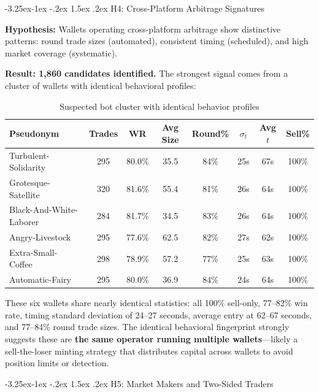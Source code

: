 \documentclass[11pt,a4paper]{article}
\makeatletter
\renewcommand\subsection{\@startsection{subsection}{2}{\z@}%
  {-3.25ex\@plus -1ex \@minus -.2ex}%
  {1.5ex \@plus .2ex}%
  {\normalfont\large\bfseries}}
\makeatother
\begin{document}
\subsection{H4: Cross-Platform Arbitrage Signatures}

\textbf{Hypothesis:} Wallets operating cross-platform arbitrage show distinctive patterns: round trade sizes (automated), consistent timing (scheduled), and high market coverage (systematic).

\textbf{Result: 1,860 candidates identified.} The strongest signal comes from a cluster of wallets with identical behavioral profiles:

\begin{table}[H]
\centering
\caption{Suspected bot cluster with identical behavior profiles}
\label{tab:bot_cluster}
\small
\begin{tabular}{@{}lccccccc@{}}
\toprule
\textbf{Pseudonym} & \textbf{Trades} & \textbf{WR} & \textbf{Avg Size} & \textbf{Round\%} & \textbf{$\sigma_t$} & \textbf{Avg $t$} & \textbf{Sell\%} \\
\midrule
Turbulent-Solidarity & 295 & 80.0\% & 35.5 & 84\% & 25s & 67s & 100\% \\
Grotesque-Satellite & 320 & 81.6\% & 55.4 & 81\% & 26s & 64s & 100\% \\
Black-And-White-Laborer & 284 & 81.7\% & 34.5 & 83\% & 26s & 64s & 100\% \\
Angry-Livestock & 295 & 77.6\% & 62.5 & 82\% & 27s & 62s & 100\% \\
Extra-Small-Coffee & 298 & 78.9\% & 57.2 & 77\% & 25s & 63s & 100\% \\
Automatic-Fairy & 295 & 80.0\% & 36.9 & 84\% & 24s & 64s & 100\% \\
\bottomrule
\end{tabular}
\end{table}

These six wallets share nearly identical statistics: all 100\% sell-only, 77--82\% win rate, timing standard deviation of 24--27 seconds, average entry at 62--67 seconds, and 77--84\% round trade sizes. The identical behavioral fingerprint strongly suggests these are \textbf{the same operator running multiple wallets}---likely a sell-the-loser minting strategy that distributes capital across wallets to avoid position limits or detection.

\clearpage
\subsection{H5: Market Makers and Two-Sided Traders}
\end{document}
